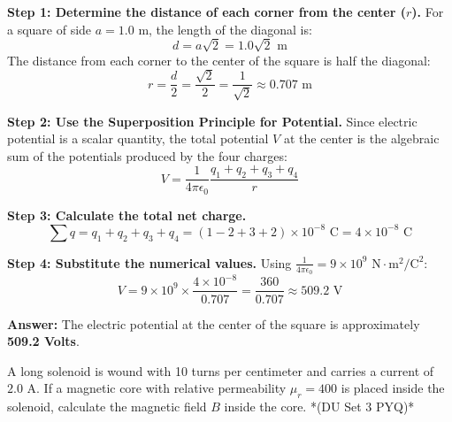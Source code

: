 \documentclass[11pt,a4paper]{article}
\begin{document}
\begin{solutionbox}
    \textbf{Step 1: Determine the distance of each corner from the center ($r$).}
    For a square of side $a = 1.0\text{ m}$, the length of the diagonal is:
    \[ d = a\sqrt{2} = 1.0\sqrt{2}\text{ m} \]
    The distance from each corner to the center of the square is half the diagonal:
    \[ r = \frac{d}{2} = \frac{\sqrt{2}}{2} = \frac{1}{\sqrt{2}} \approx 0.707\text{ m} \]
    
    \textbf{Step 2: Use the Superposition Principle for Potential.}
    Since electric potential is a scalar quantity, the total potential $V$ at the center is the algebraic sum of the potentials produced by the four charges:
    \[ V = \frac{1}{4\pi\epsilon_0} \frac{q_1 + q_2 + q_3 + q_4}{r} \]
    
    \textbf{Step 3: Calculate the total net charge.}
    \[ \sum q = q_1 + q_2 + q_3 + q_4 = (1 - 2 + 3 + 2) \times 10^{-8}\text{ C} = 4 \times 10^{-8}\text{ C} \]
    
    \textbf{Step 4: Substitute the numerical values.}
    Using $\frac{1}{4\pi\epsilon_0} = 9 \times 10^9 \text{ N}\cdot\text{m}^2/\text{C}^2$:
    \[ V = 9 \times 10^9 \times \frac{4 \times 10^{-8}}{0.707} = \frac{360}{0.707} \approx 509.2\text{ V} \]
    
    \textbf{Answer:} The electric potential at the center of the square is approximately \textbf{509.2 Volts}.
\end{solutionbox}

\vspace{0.8cm}

\begin{questionbox}
    A long solenoid is wound with 10 turns per centimeter and carries a current of $2.0\text{ A}$. If a magnetic core with relative permeability $\mu_r = 400$ is placed inside the solenoid, calculate the magnetic field $B$ inside the core. *(DU Set 3 PYQ)*
\end{questionbox}
\end{document}
